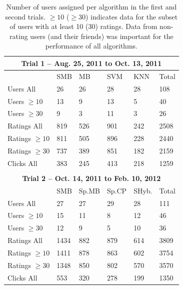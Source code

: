 \begin{table}[t!]
\centering \footnotesize
\begin{tabular}{|l|l|l|l|l|l|}
\multicolumn{6}{c}{\bf Trial 1 -- Aug. 25, 2011 to Oct. 13, 2011 } \\ \hline 
 & {\rm SMB} & {\rm MB} & {\rm SVM} & {\rm KNN} & {\rm Total}\\ \hline 
{\rm Users All}          & 26  & 26  & 28  & 28  & 108  \\ 
{\rm Users $\geq 10$}    & 13  & 9   & 13  & 5   & 40   \\ 
{\rm Users $\geq 30$}    &  9  & 3   & 11  & 3   & 26   \\ \hline 
{\rm Ratings All}        & 819 & 526 & 901 & 242 & 2508 \\ 
{\rm Ratings $\geq 10$}  & 811 & 505 & 896 & 228 & 2440 \\ 
{\rm Ratings $\geq 30$}  & 737 & 389 & 851 & 182 & 2159 \\ \hline %
{\rm Clicks All}   & 383 & 245 & 413 & 218 & 1259 \\ \hline 
\multicolumn{6}{c}{} \\  
\multicolumn{6}{c}{\bf Trial 2 -- Oct. 14, 2011 to Feb. 10, 2012} \\ \hline 
 & {\rm SMB} & {\rm Sp.MB} & {\rm Sp.CP} & {\rm SHyb.} & {\rm Total}\\ \hline 
{\rm Users All}          & 27   & 27  & 29  & 28  & 111  \\ 
{\rm Users $\geq 10$}    & 15   & 11  & 8   & 12  & 46   \\ 
{\rm Users $\geq 30$}    & 12   & 9   & 5   & 10  & 36   \\ \hline 
{\rm Ratings All}        & 1434 & 882 & 879 & 614 & 3809 \\  
{\rm Ratings $\geq 10$}  & 1411 & 878 & 863 & 602 & 3754 \\ 
{\rm Ratings $\geq 30$}  & 1348 & 850 & 802 & 570 & 3570 \\ \hline %
{\rm Clicks All}         & 553  & 320 & 278 & 199 & 1350 \\ \hline 
\end{tabular}
\caption{\footnotesize
Number of users assigned per algorithm in the first and
second trials.  $\geq 10$ ($\geq 30$) indicates data for
the subset of users with at least 10 (30) ratings.  Data
from non-rating users (and their friends) was important for
the performance of all algorithms.}
\vspace{-2.5mm}
\label{tab:Assigned1}
\end{table}

